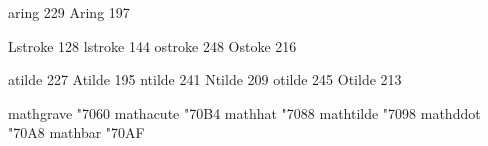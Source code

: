  aring            229
 Aring            197

 Lstroke          128
 lstroke          144
 ostroke          248
 Ostoke           216

 atilde           227
 Atilde           195
 ntilde           241
 Ntilde           209
 otilde           245
 Otilde           213

\stopencoding


\startencoding[texnansi]

 mathgrave       "7060 
 mathacute       "70B4 
 mathhat         "7088 
 mathtilde       "7098 
 mathddot        "70A8 
 mathbar         "70AF 

\stopencoding

\endinput

